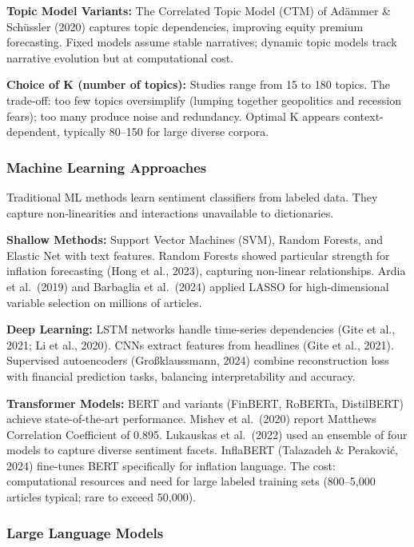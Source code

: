 \documentclass[12pt,a4paper]{article}
\begin{document}
\textbf{Topic Model Variants:} The Correlated Topic Model (CTM) of Adämmer \& Schüssler (2020) captures topic dependencies, improving equity premium forecasting. Fixed models assume stable narratives; dynamic topic models track narrative evolution but at computational cost.

\textbf{Choice of K (number of topics):} Studies range from 15 to 180 topics. The trade-off: too few topics oversimplify (lumping together geopolitics and recession fears); too many produce noise and redundancy. Optimal K appears context-dependent, typically 80--150 for large diverse corpora.

\subsubsection{Machine Learning Approaches}

Traditional ML methods learn sentiment classifiers from labeled data. They capture non-linearities and interactions unavailable to dictionaries.

\textbf{Shallow Methods:} Support Vector Machines (SVM), Random Forests, and Elastic Net with text features. Random Forests showed particular strength for inflation forecasting (Hong et al., 2023), capturing non-linear relationships. Ardia et al.\ (2019) and Barbaglia et al.\ (2024) applied LASSO for high-dimensional variable selection on millions of articles.

\textbf{Deep Learning:} LSTM networks handle time-series dependencies (Gite et al., 2021; Li et al., 2020). CNNs extract features from headlines (Gite et al., 2021). Supervised autoencoders (Großklaussmann, 2024) combine reconstruction loss with financial prediction tasks, balancing interpretability and accuracy.

\textbf{Transformer Models:} BERT and variants (FinBERT, RoBERTa, DistilBERT) achieve state-of-the-art performance. Mishev et al.\ (2020) report Matthews Correlation Coefficient of 0.895. Lukauskas et al.\ (2022) used an ensemble of four models to capture diverse sentiment facets. InflaBERT (Talazadeh \& Peraković, 2024) fine-tunes BERT specifically for inflation language. The cost: computational resources and need for large labeled training sets (800--5,000 articles typical; rare to exceed 50,000).

\subsubsection{Large Language Models}
\end{document}
